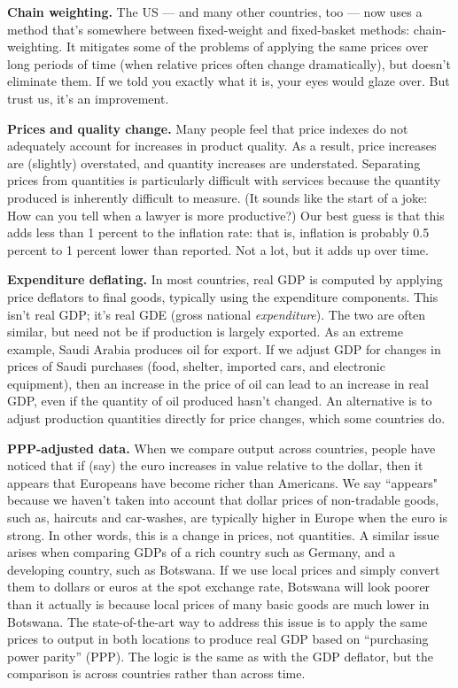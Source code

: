 \textbf{Chain weighting.}
The US --- and many other countries, too ---
now uses a method that's somewhere between fixed-weight and fixed-basket methods:  chain-weighting.
It mitigates some of the problems of applying the same prices over
long periods of time (when relative prices often change dramatically),
but doesn't eliminate them.
If we told you exactly what it is, your eyes would glaze over.
But trust us, it's an improvement.

\textbf{Prices and quality change.} Many people feel that price
indexes do not adequately account for increases in product
quality. As a result, price increases are (slightly) overstated,
and quantity increases are understated.
Separating prices from quantities is particularly
difficult with services because the quantity produced is inherently
difficult to measure. (It sounds like the start of a joke:  How
can you tell when a lawyer is more productive?)  Our best guess is
that this adds less than  1 percent to the inflation rate:  that is,
inflation is probably 0.5 percent to 1 percent lower than reported.
Not a lot, but it adds up over time.

\textbf{Expenditure deflating.}
In most countries, real GDP is computed by
applying price deflators to final goods, typically using the expenditure components.
This isn't real GDP; it's real GDE (gross national {\it expenditure\/}).  The two are often similar, but need not be if production is largely exported.
As an extreme example, Saudi Arabia produces oil for export.
If we adjust GDP for changes in prices of Saudi purchases
(food, shelter, imported cars, and electronic equipment),
then an increase in the price of oil can lead to an increase in real GDP,
even if the quantity of oil produced hasn't changed.
An alternative is to adjust production quantities directly for price changes,
which some countries do.

\textbf{PPP-adjusted data.} When we compare output across countries, people have noticed that
if (say) the euro increases in value relative to the dollar, then
it appears that Europeans have become richer than Americans. We
say ``appears" because we haven't taken into account that dollar
prices of non-tradable goods, such as, haircuts and car-washes, are
typically higher in Europe when the euro is strong. In other
words, this is a change in prices, not quantities. A similar issue
arises when comparing GDPs of a rich country such as Germany, and a
developing country, such as Botswana. If we use local prices and
simply convert them to dollars or euros at the spot exchange rate,
Botswana will look poorer than it actually is because local
prices of many basic goods are much lower in Botswana. The
state-of-the-art way to address this issue is to apply the same
prices to output in both locations to produce real GDP based on ``purchasing power
parity'' (PPP). The logic is the same as with the
GDP deflator, but the comparison is across countries rather
than across time.


